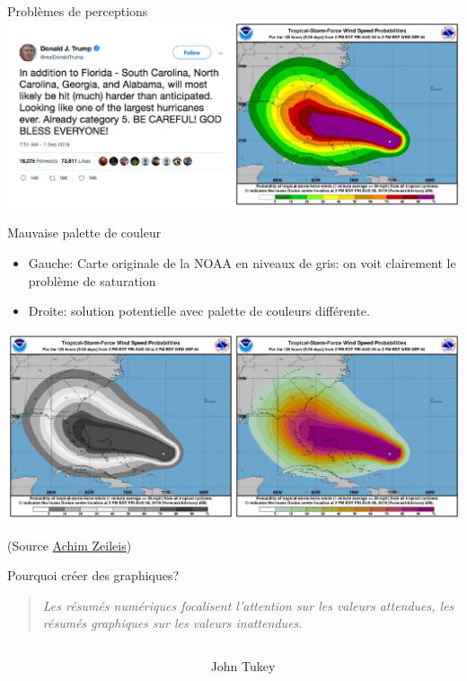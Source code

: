 \documentclass[
  ignorenonframetext,
]{beamer}
\begin{document}
\begin{frame}{Problèmes de perceptions}
\protect\hypertarget{probluxe8mes-de-perceptions}{}
\includegraphics{MATH60602-diapos1_files/figure-beamer/unnamed-chunk-13-1.pdf}
\end{frame}

\begin{frame}{Mauvaise palette de couleur}
\protect\hypertarget{mauvaise-palette-de-couleur}{}
\begin{itemize}
\item
  Gauche: Carte originale de la NOAA en niveaux de gris: on voit
  clairement le problème de saturation
\item
  Droite: solution potentielle avec palette de couleurs différente.
\end{itemize}

\includegraphics{MATH60602-diapos1_files/figure-beamer/unnamed-chunk-14-1.pdf}

(Source \href{https://www.zeileis.org/news/dorian_rainbow/}{Achim
Zeileis})
\end{frame}

\begin{frame}{Pourquoi créer des graphiques?}
\protect\hypertarget{pourquoi-cruxe9er-des-graphiques}{}
\begin{quote}
\emph{Les résumés numériques focalisent l'attention sur les valeurs
attendues, les résumés graphiques sur les valeurs inattendues.}
\end{quote}

\begin{columns}[T]
\begin{column}{0.8\textwidth}
\end{column}

\begin{column}{0.2\textwidth}
John Tukey
\end{column}
\end{columns}
\end{frame}
\end{document}
